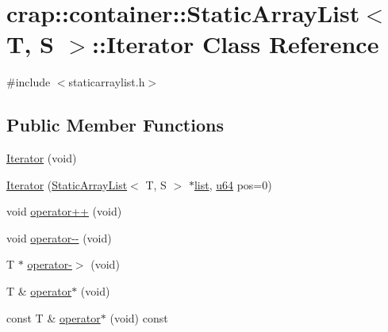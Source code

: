 \hypertarget{classcrap_1_1container_1_1_static_array_list_1_1_iterator}{\section{crap\-:\-:container\-:\-:Static\-Array\-List$<$ T, S $>$\-:\-:Iterator Class Reference}
\label{classcrap_1_1container_1_1_static_array_list_1_1_iterator}
}


{\ttfamily \#include $<$staticarraylist.\-h$>$}

\subsection*{Public Member Functions}
\begin{DoxyCompactItemize}
\item 
\hyperlink{classcrap_1_1container_1_1_static_array_list_1_1_iterator_a7ff5383171b22a37b6b1978315683ba7}{Iterator} (void)
\item 
\hyperlink{classcrap_1_1container_1_1_static_array_list_1_1_iterator_a6c257478a2a080ea9ca3a4478bc81fe8}{Iterator} (\hyperlink{classcrap_1_1container_1_1_static_array_list}{Static\-Array\-List}$<$ T, S $>$ $\ast$\hyperlink{classcrap_1_1list}{list}, \hyperlink{types_8h_a3f7e2bcbb0b4c338f3c4f6c937cd4234}{u64} pos=0)
\item 
void \hyperlink{classcrap_1_1container_1_1_static_array_list_1_1_iterator_adb0db0b8600335709d1c26ab3662f1ad}{operator++} (void)
\item 
void \hyperlink{classcrap_1_1container_1_1_static_array_list_1_1_iterator_a8758dd27496784004e8bb302d3a19afd}{operator-\/-\/} (void)
\item 
T $\ast$ \hyperlink{classcrap_1_1container_1_1_static_array_list_1_1_iterator_a02aeafa79be93e476d1024b8da340278}{operator-\/$>$} (void)
\item 
T \& \hyperlink{classcrap_1_1container_1_1_static_array_list_1_1_iterator_ac4bf3d33679da671696eff0cc809ae6d}{operator$\ast$} (void)
\item 
const T \& \hyperlink{classcrap_1_1container_1_1_static_array_list_1_1_iterator_a53a24ba44b743022ffa6e5cf85244771}{operator$\ast$} (void) const 
\end{DoxyCompactItemize}


